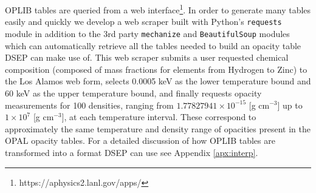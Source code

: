 OPLIB tables are queried from a web
interface\footnote{https://aphysics2.lanl.gov/apps/}. In order to generate many
tables easily and quickly we develop a web scraper built with Python's
\texttt{requests} module in addition to the 3rd party \texttt{mechanize} and
\texttt{BeautifulSoup} modules \citep{chandra2015python,
richardson2007beautiful} which can automatically retrieve all the tables needed
to build an opacity table DSEP can make use of. This web scraper submits a user
requested chemical composition (composed of mass fractions for elements from
Hydrogen to Zinc) to the Los Alamos web form, selects 0.0005 keV as the lower
temperature bound and 60 keV as the upper temperature bound, and finally
requests opacity measurements for 100 densities, ranging from $1.77827941\times
10 ^{-15}$ [g cm$^{-3}$] up to $1\times10^{7}$ [g cm$^{-3}$], at each
temperature interval. These correspond to approximately the same temperature
and density range of opacities present in the OPAL opacity tables. For a
detailed discussion of how OPLIB tables are transformed into a format DSEP can
use see Appendix \ref{apx:interp}.

